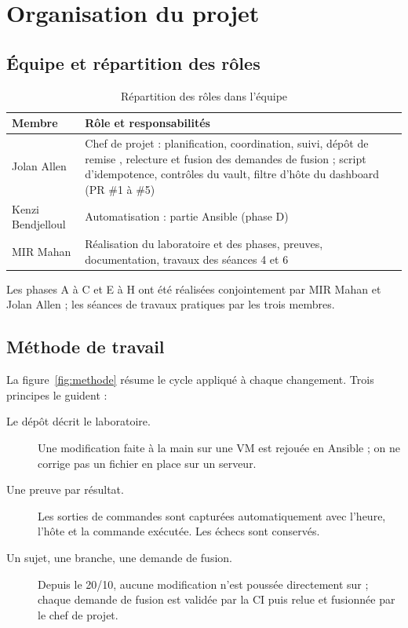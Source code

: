 \chapter{Organisation du projet}\label{chap:organisation}

\section{Équipe et répartition des rôles}

\begin{table}[H]
\centering
\caption{Répartition des rôles dans l'équipe}\label{tab:equipe}
\begin{tabularx}{\linewidth}{@{}P{4cm}L@{}}
\toprule
\textbf{Membre} & \textbf{Rôle et responsabilités} \\
\midrule
Jolan Allen & Chef de projet : planification, coordination, suivi, dépôt de remise
              , relecture et fusion des demandes de fusion ; script
              d'idempotence, contrôles du vault, filtre d'hôte du dashboard (PR \#1 à \#5) \\
Kenzi Bendjelloul & Automatisation : partie Ansible (phase D) \\
MIR Mahan & Réalisation du laboratoire et des phases, preuves, documentation, travaux des séances 4 et 6 \\
\bottomrule
\end{tabularx}
\end{table}

Les phases A à C et E à H ont été réalisées conjointement par MIR Mahan et Jolan Allen ; les
séances de travaux pratiques par les trois membres.

\section{Méthode de travail}

La figure~\ref{fig:methode} résume le cycle appliqué à chaque changement. Trois principes le
guident :
\begin{description}
  \item[Le dépôt décrit le laboratoire.] Une modification faite à la main sur une VM est rejouée en
        Ansible ; on ne corrige pas un fichier en place sur un serveur.
  \item[Une preuve par résultat.] Les sorties de commandes sont capturées automatiquement avec
        l'heure, l'hôte et la commande exécutée. Les échecs sont conservés.
  \item[Un sujet, une branche, une demande de fusion.] Depuis le 20/10, aucune modification n'est
        poussée directement sur  ; chaque demande de fusion est validée par la CI puis
        relue et fusionnée par le chef de projet.
\end{description}

